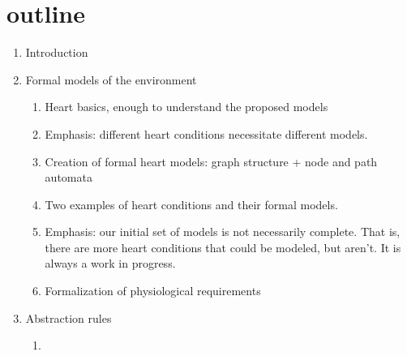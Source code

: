 \section{outline}
\begin{enumerate}
	\item Introduction
	
	\item Formal models of the environment
	\begin{enumerate}
		\item Heart basics, enough to understand the proposed models
		\item Emphasis: different heart conditions necessitate different models.
		\item Creation of formal heart models: graph structure + node and path automata
		\item Two examples of heart conditions and their formal models.
		\item Emphasis: our initial set of models is not necessarily complete. That is, there are more heart conditions that could be modeled, but aren't. It is always a work in progress.		
		\item Formalization of physiological requirements
	\end{enumerate}
	
	\item Abstraction rules
	\begin{enumerate}
		\item 
	\end{enumerate}
\end{enumerate}


